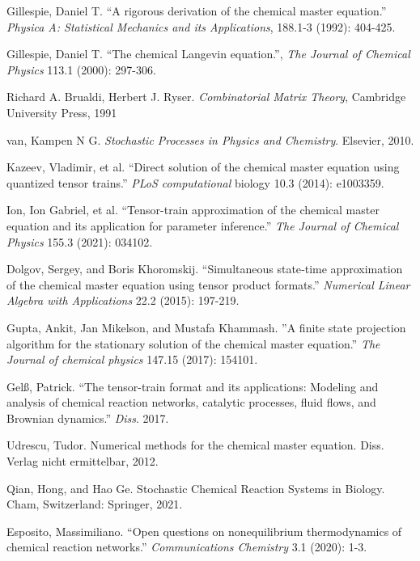 \documentclass[conference]{IEEEtran}
\begin{document}
\begin{thebibliography}{100} %
 Gillespie, Daniel T. ``A rigorous derivation of the chemical master equation.'' {\it Physica A: Statistical Mechanics and its Applications}, 188.1-3 (1992): 404-425.

 Gillespie, Daniel T. ``The chemical Langevin equation.'', {\it The Journal of Chemical Physics} 113.1 (2000): 297-306.

 Richard A. Brualdi, Herbert J. Ryser. {\it Combinatorial Matrix Theory}, Cambridge University Press, 1991

 van, Kampen N G. {\it Stochastic Processes in Physics and Chemistry}. Elsevier, 2010. 

 Kazeev, Vladimir, et al. ``Direct solution of the chemical master equation using quantized tensor trains.'' {\it PLoS computational} biology 10.3 (2014): e1003359.

 Ion, Ion Gabriel, et al. ``Tensor-train approximation of the chemical master equation and its application for parameter inference.'' {\it The Journal of Chemical Physics} 155.3 (2021): 034102.

 Dolgov, Sergey, and Boris Khoromskij. ``Simultaneous state‐time approximation of the chemical master equation using tensor product formats.'' {\it Numerical Linear Algebra with Applications} 22.2 (2015): 197-219.

 Gupta, Ankit, Jan Mikelson, and Mustafa Khammash. ''A finite state projection algorithm for the stationary solution of the chemical master equation.'' {\it The Journal of chemical physics} 147.15 (2017): 154101.

 Gelß, Patrick. ``The tensor-train format and its applications: Modeling and analysis of chemical reaction networks, catalytic processes, fluid flows, and Brownian dynamics.'' {\it Diss}. 2017.

 Udrescu, Tudor. Numerical methods for the chemical master equation. Diss. Verlag nicht ermittelbar, 2012.

 Qian, Hong, and Hao Ge. Stochastic Chemical Reaction Systems in Biology. Cham, Switzerland: Springer, 2021.

 Esposito, Massimiliano. ``Open questions on nonequilibrium thermodynamics of chemical reaction networks.'' {\it Communications Chemistry} 3.1 (2020): 1-3.


\end{thebibliography}
\end{document}
